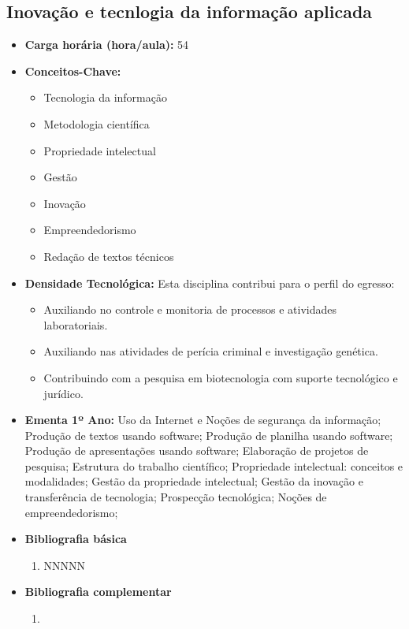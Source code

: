 \documentclass[11pt,fleqn]{book} %
\begin{document}
\subsection{Inovação e tecnlogia da informação aplicada}\label{disc:info}
\begin{itemize}
	\item \textbf{Carga horária (hora/aula):} 54
	\item \textbf{Conceitos-Chave:}
	\begin{itemize}
		\item Tecnologia da informação
		\item Metodologia científica
		\item Propriedade intelectual
		\item Gestão
		\item Inovação
		\item Empreendedorismo
		\item Redação de textos técnicos
	\end{itemize}
	\item \textbf{Densidade Tecnológica:} Esta disciplina contribui para o perfil do egresso:
	\begin{itemize}
		\item Auxiliando no controle e monitoria de processos e atividades laboratoriais.
		\item Auxiliando nas atividades de perícia criminal e investigação genética.
		\item Contribuindo com a pesquisa em biotecnologia com suporte tecnológico e jurídico.
	\end{itemize}
	\item \textbf{Ementa 1º Ano:}		
	Uso da Internet e Noções de segurança da informação;
	Produção de textos usando software;
	Produção de planilha usando software;
	Produção de apresentações usando software;
	Elaboração de projetos de pesquisa; 
	Estrutura do trabalho científico;
	Propriedade intelectual: conceitos e modalidades;
	Gestão da propriedade intelectual;
	Gestão da inovação e transferência de tecnologia;
	Prospecção tecnológica;
	Noções de empreendedorismo;
	\item \textbf{Bibliografia básica}
	\begin{enumerate}
		\item NNNNN
	\end{enumerate}
	\item \textbf{Bibliografia complementar}
	\begin{enumerate}
		\item 
	\end{enumerate}	
\end{itemize}
\end{document}
